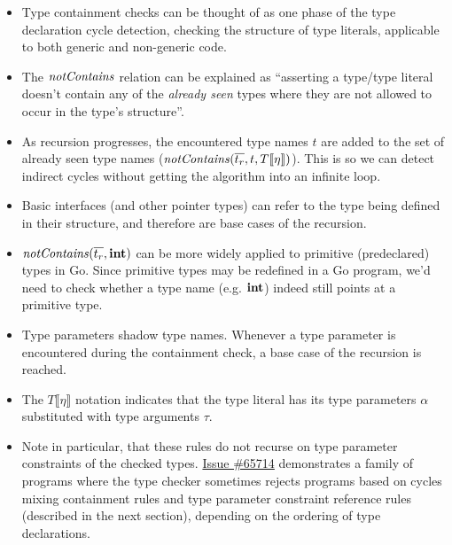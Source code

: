 \documentclass[12pt]{article}
\begin{document}
\begin{itemize}
    \item Type containment checks can be thought of as one phase of the type
          declaration cycle detection, checking the structure of type literals,
          applicable to both generic and non-generic code.

    \item The $\mathit{notContains}$ relation can be explained as ``asserting a type/type
          literal doesn't contain any of the \emph{already seen} types where they are
          not allowed to occur in the type's structure''.

    \item As recursion progresses, the encountered type names $t$ are added to
          the set of already seen type names ($\mathit{notContains}(\overline{t_r}, t, T
              \llbracket\eta\rrbracket)$). This is so we can detect indirect cycles
          without getting the algorithm into an infinite loop.

    \item Basic interfaces (and other pointer types) can refer to the type being
          defined in their structure, and therefore are base cases of the
          recursion.

    \item $\mathit{notContains}(\overline{t_r}, \texttt{\bf int})$ can be more widely applied to primitive
          (predeclared) types in Go. Since primitive types may be redefined in a Go
          program, we'd need to check whether a type name (e.g. $\texttt{\bf int}$) indeed
          still points at a primitive type.

    \item Type parameters shadow type names. Whenever a type parameter is
          encountered during the containment check, a base case of the recursion is
          reached.

    \item The $T \llbracket\eta\rrbracket$ notation indicates that the type
          literal has its type parameters $\alpha$ substituted with type arguments
          $\tau$.

    \item Note in particular, that these rules do not recurse on type parameter
          constraints of the checked types.
          \href{https://github.com/golang/go/issues/65714}{Issue \#65714}
          demonstrates a family of programs where the type checker sometimes
          rejects programs based on cycles mixing containment rules and type
          parameter constraint reference rules (described in the next section),
          depending on the ordering of type declarations.
\end{itemize}
\end{document}
